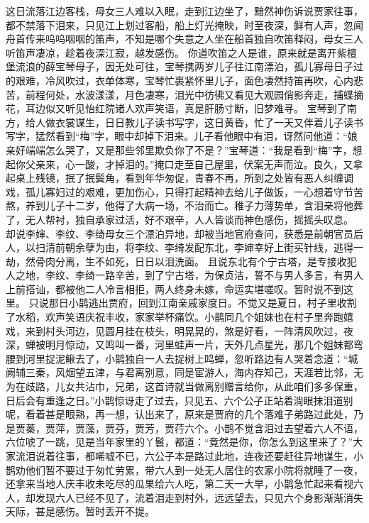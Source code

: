 \documentclass[12pt,oneside]{book}
\begin{document}
这日流落江边客栈，母女三人难以入眠，走到江边坐了，黯然神伤诉说贾家往事，都不禁落下泪来，只见江上划过客船，船上灯光掩映，时至夜深，鲜有人声，忽闻舟首传来呜呜咽咽的笛声，不知是哪个失意之人坐在船首独自吹笛释闷，母女三人听笛声凄凉，趁着夜深江寂，越发感伤。
你道吹笛之人是谁，原来就是离开紫檀堡流浪的薛宝琴母子，因无处可往，宝琴携两岁儿子往江南漂泊，孤儿寡母日子过的艰难，冷风吹过，衣单体寒，宝琴忙裹紧怀里儿子，面色凄然持笛再吹，心内悲苦，前程何处，水波漾漾，月色凄寒，泪光中彷彿又看见大观园俏影奔走，捕蝶摘花，耳边似又听见怡红院诸人欢声笑语，真是肝肠寸断，旧梦难寻。
宝琴到了南方，给人做衣裳谋生，日日教儿子读书写字，这日黄昏，忙了一天又伴着儿子读书写字，猛然看到“梅”字，眼中却掉下泪来。儿子看他眼中有泪，讶然问他道：“娘亲好端端怎么哭了，又是那些邻里欺负你了不是？”宝琴道：“我是看到“梅”字，想起你父亲来，心一酸，才掉泪的。”掩口走至自己屋里，伏案无声而泣。良久，又拿起桌上残镜，抿了抿鬓角，看到年华匆促，青春不再，所到之处皆有恶人纠缠调戏，孤儿寡妇过的艰难，更加伤心，只得打起精神去给儿子做饭，一心想着守节苦熬，养到儿子十二岁，他得了大病一场，不治而亡。稚子力薄势单，含泪亲将他葬了，无人帮衬，独自承家过活，好不艰辛，人人皆谈而神色感伤，摇摇头叹息。
却说李婶、李纹、李绮母女三个漂泊异地，却被当地官府查问，获悉是前朝官员后人，以扫清前朝余孽为由，将李纹、李绮发配东北，李婶幸好上街买针线，逃得一劫，然骨肉分离，生不如死，日日以泪洗面。
且说东北有个宁古塔，是专接收犯人之地，李纹、李绮一路辛苦，到了宁古塔，为保贞洁，誓不与男人多言，有男人上前搭讪，都被他二人冷言相拒，两人终身未嫁，命运实堪嗟叹。暂时说不到这里。
只说那日小鹊逃出贾府，回到江南亲戚家度日。不觉又是夏日，村子里收割了水稻，欢声笑语庆祝丰收，家家举杯痛饮。小鹊同几个姐妹也在村子里奔跑嬉戏，来到村头河边，见圆月挂在枝头，明晃晃的，煞是好看，一阵清风吹过，夜深，蝉被明月惊动，又鸣叫一番，河里蛙声一片，天外几点星光，那几个姐妹都弯腰到河里捉泥鳅去了，小鹊独自一人去捉树上鸣蝉，忽听路边有人哭着念道：“城阙辅三秦，风烟望五津，与君离别意，同是宦游人，海内存知己，天涯若比邻，无为在歧路，儿女共沾巾，兄弟，这首诗就当做离别赠言给你，从此咱们多多保重，日后会有重逢之日。”小鹊惊讶走了过去，只见五、六个公子正站着淌眼抹泪道别呢，看着甚是眼熟，再一想，认出来了，原来是贾府的几个落难子弟路过此处，乃是贾蓁，贾萍，贾藻，贾芬，贾芳，贾荇六个。小鹊不觉含泪过去望着六人不语，六位唬了一跳，见是当年家里的丫鬟，都道：“竟然是你，你怎么到这里来了？”大家流泪说着往事，都唏嘘不已，六公子本是路过此地，连夜还要赶往异地谋生，小鹊劝他们暂不要过于匆忙劳累，带六人到一处无人居住的农家小院将就睡了一夜，还拿来当地人庆丰收未吃尽的瓜果给六人吃，第二天一大早，小鹊急忙起来看视六人，却发现六人已经不见了，流着泪走到村外，远远望去，只见六个身影渐渐消失天际，甚是感伤。暂时丢开不提。
\end{document}
